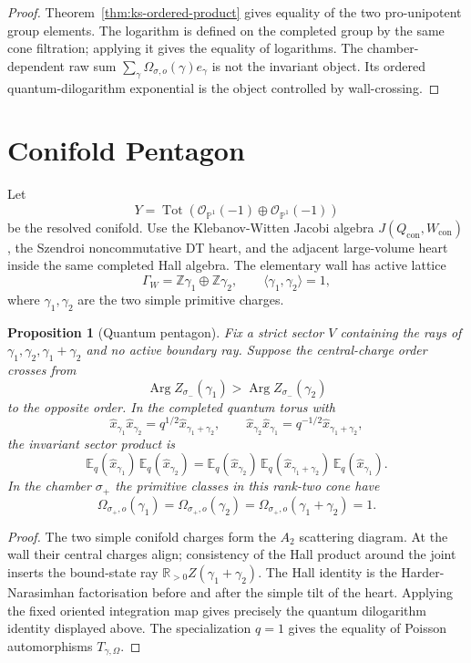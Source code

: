 \documentclass[11pt]{article}
\newtheorem{proposition}[theorem]{Proposition}
\theoremstyle{definition}
\providecommand{\Z}{\mathbb{Z}}
\providecommand{\R}{\mathbb{R}}
\providecommand{\bP}{\mathbb{P}}
\providecommand{\cO}{\mathcal{O}}
\providecommand{\Arg}{\operatorname{Arg}}
\begin{document}
\begin{proof}
Theorem~\ref{thm:ks-ordered-product} gives equality of the two
pro-unipotent group elements.  The logarithm is defined on the completed
group by the same cone filtration; applying it gives the equality of
logarithms.  The chamber-dependent raw sum
$\sum_\gamma\Omega_{\sigma,o}(\gamma)e_\gamma$ is not the invariant
object.  Its ordered quantum-dilogarithm exponential is the object
controlled by wall-crossing.
\end{proof}

\section{Conifold Pentagon}

Let
\[
 Y=\operatorname{Tot}(\cO_{\bP^1}(-1)\oplus\cO_{\bP^1}(-1))
\]
be the resolved conifold.  Use the Klebanov-Witten Jacobi algebra
$J(Q_{\mathrm{con}},W_{\mathrm{con}})$, the Szendroi noncommutative DT
heart, and the adjacent large-volume heart inside the same completed
Hall algebra.  The elementary wall has active lattice
\[
 \Gamma_W=\Z\gamma_1\oplus\Z\gamma_2,\qquad
 \langle\gamma_1,\gamma_2\rangle=1,
\]
where $\gamma_1,\gamma_2$ are the two simple primitive charges.

\begin{proposition}[Quantum pentagon]
\label{prop:conifold-pentagon}
Fix a strict sector $V$ containing the rays of
$\gamma_1,\gamma_2,\gamma_1+\gamma_2$ and no active boundary ray.
Suppose the central-charge order crosses from
\[
 \Arg Z_{\sigma_-}(\gamma_1)>\Arg Z_{\sigma_-}(\gamma_2)
\]
to the opposite order.  In the completed quantum torus with
\[
 \hat x_{\gamma_1}\hat x_{\gamma_2}
 =
 q^{1/2}\hat x_{\gamma_1+\gamma_2},
 \qquad
 \hat x_{\gamma_2}\hat x_{\gamma_1}
 =
 q^{-1/2}\hat x_{\gamma_1+\gamma_2},
\]
the invariant sector product is
\[
 \mathbb E_q(\hat x_{\gamma_1})\,
 \mathbb E_q(\hat x_{\gamma_2})
 =
 \mathbb E_q(\hat x_{\gamma_2})\,
 \mathbb E_q(\hat x_{\gamma_1+\gamma_2})\,
 \mathbb E_q(\hat x_{\gamma_1}).
\]
In the chamber $\sigma_+$ the primitive classes in this rank-two cone
have
\[
 \Omega_{\sigma_+,o}(\gamma_1)=
 \Omega_{\sigma_+,o}(\gamma_2)=
 \Omega_{\sigma_+,o}(\gamma_1+\gamma_2)=1 .
\]
\end{proposition}

\begin{proof}
The two simple conifold charges form the $A_2$ scattering diagram.  At
the wall their central charges align; consistency of the Hall product
around the joint inserts the bound-state ray
$\R_{>0}Z(\gamma_1+\gamma_2)$.  The Hall identity is the
Harder-Narasimhan factorisation before and after the simple tilt of the
heart.  Applying the fixed oriented integration map gives precisely the
quantum dilogarithm identity displayed above.  The specialization
$q=1$ gives the equality of Poisson automorphisms
$T_{\gamma,\Omega}$.
\end{proof}
\end{document}
